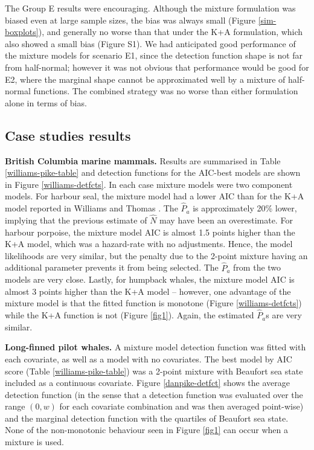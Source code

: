 \documentclass[10pt]{article}
\begin{document}
The Group E results were encouraging.  Although the mixture formulation was biased even at large sample sizes, the bias was always small (Figure \ref{sim-boxplots}), and generally no worse than that under the K+A formulation, which also showed a small bias (Figure S1). We had anticipated good performance of the mixture models for scenario E1, since the detection function shape is not far from half-normal; however it was not obvious that performance would be good for E2, where the marginal shape cannot be approximated well by a mixture of half-normal functions.  The combined strategy was no worse than either formulation alone in terms of bias.  


\subsection*{Case studies results}

\textbf{British Columbia marine mammals.} Results are summarised in Table \ref{williams-pike-table} and detection functions for the AIC-best models are shown in Figure \ref{williams-detfcts}. In each case mixture models were two component models.  For harbour seal, the mixture model had a lower AIC than for the K+A model reported in Williams and Thomas \cite{Williams:2007tc}. The $\hat{P}_a$ is approximately 20\% lower, implying that the previous estimate of $\hat{N}$ may have been an overestimate.  For harbour porpoise, the mixture model AIC is almost 1.5 points higher than the K+A model, which was a hazard-rate with no adjustments.  Hence, the model likelihoods are very similar, but the penalty due to the 2-point mixture having an additional parameter prevents it from being selected.  The $\hat{P}_a$ from the two models are very close.  Lastly, for humpback whales, the mixture model AIC is almost 3 points higher than the K+A model -- however, one advantage of the mixture model is that the fitted function is monotone (Figure \ref{williams-detfcts}) while the K+A function is not (Figure \ref{fig1}).  Again, the estimated $\hat{P}_a$s are very similar.

\textbf{Long-finned pilot whales.} A mixture model detection function was fitted with each covariate, as well as a model with no covariates. The best model by AIC score (Table \ref{williams-pike-table}) was a 2-point mixture with Beaufort sea state included as a continuous covariate. Figure \ref{danpike-detfct} shows the average detection function (in the sense that a detection function was evaluated over the range $(0,w)$ for each covariate combination and was then averaged point-wise) and the marginal detection function with the quartiles of Beaufort sea state. None of the non-monotonic behaviour seen in Figure \ref{fig1} can occur when a mixture is used.
\end{document}
